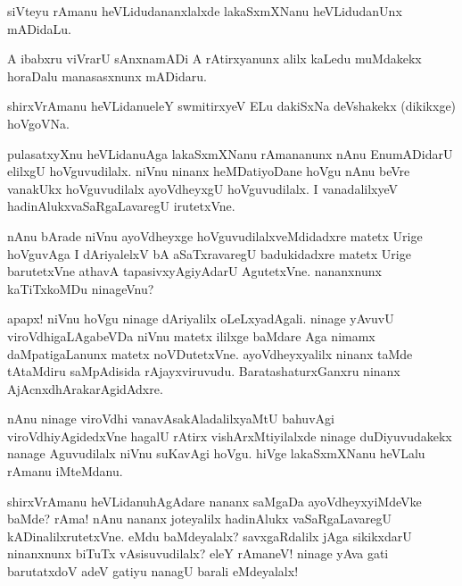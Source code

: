 \begin{mng}
siVteyu rAmanu heVLidudananxlalxde lakaSxmXNanu heVLidudanUnx mADidaLu.
\end{mng}

\begin{mng}
A ibabxru viVrarU sAnxnamADi A rAtirxyanunx alilx kaLedu muMdakekx horaDalu manasasxnunx mADidaru.
\end{mng}

\begin{mng}
shirxVrAmanu heVLidanu\mdash eleY swmitirxyeV ELu dakiSxNa deVshakekx (dikikxge) hoVgoVNa.
\end{mng}

\begin{mng}
pulasatxyXnu heVLidanu\mdash Aga lakaSxmXNanu rAmananunx nAnu EnumADidarU elilxgU hoVguvudilalx. niVnu ninanx heMDatiyoDane hoVgu nAnu beVre vanakUkx hoVguvudilalx ayoVdheyxgU hoVguvudilalx. I vanadalilxyeV hadinAlukxvaSaRgaLavaregU irutetxVne.
\end{mng}

\begin{mng}
nAnu bArade niVnu ayoVdheyxge hoVguvudilalxveMdidadxre matetx Urige hoVguvAga I dAriyalelxV bA aSaTxravaregU badukidadxre matetx Urige barutetxVne athavA tapasivxyAgiyAdarU AgutetxVne. nananxnunx kaTiTxkoMDu ninageVnu?
\end{mng}

\begin{mng}
apapx! niVnu hoVgu ninage dAriyalilx oLeLxyadAgali. ninage yAvuvU viroVdhigaLAgabeVDa niVnu matetx ililxge baMdare Aga nimamx daMpatigaLanunx matetx noVDutetxVne. ayoVdheyxyalilx ninanx taMde tAtaMdiru saMpAdisida rAjayxviruvudu. BaratashaturxGanxru ninanx AjAcnxdhArakarAgidAdxre.
\end{mng}

\begin{mng}
nAnu ninage viroVdhi vanavAsakAladalilxyaMtU bahuvAgi viroVdhiyAgidedxVne hagalU rAtirx vishArxMtiyilalxde ninage duDiyuvudakekx nanage Aguvudilalx niVnu suKavAgi hoVgu. hiVge lakaSxmXNanu heVLalu rAmanu iMteMdanu.
\end{mng}

\begin{mng}
shirxVrAmanu heVLidanu\mdash hAgAdare nananx saMgaDa ayoVdheyxyiMdeVke baMde? rAma! nAnu nananx joteyalilx hadinAlukx vaSaRgaLavaregU kADinalilxrutetxVne. eMdu baMdeyalalx? savxgaRdalilx jAga sikikxdarU ninanxnunx biTuTx vAsisuvudilalx? eleY rAmaneV! ninage yAva gati barutatxdoV adeV gatiyu nanagU barali eMdeyalalx!
\end{mng}

